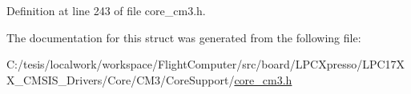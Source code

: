\-Definition at line 243 of file core\-\_\-cm3.\-h.



\-The documentation for this struct was generated from the following file\-:\begin{DoxyCompactItemize}
\item 
\-C\-:/tesis/localwork/workspace/\-Flight\-Computer/src/board/\-L\-P\-C\-Xpresso/\-L\-P\-C17\-X\-X\-\_\-\-C\-M\-S\-I\-S\-\_\-\-Drivers/\-Core/\-C\-M3/\-Core\-Support/\hyperlink{core__cm3_8h}{core\-\_\-cm3.\-h}\end{DoxyCompactItemize}
